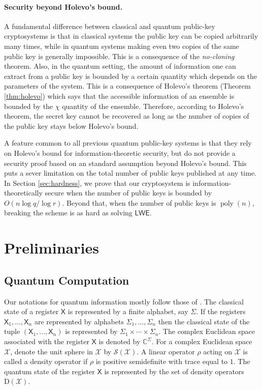 \documentclass[11pt]{article}
\theoremstyle{plain}
\theoremstyle{definition}
\DeclareMathOperator{\poly}{poly}
\def\C{\mathbb{C}}
\def\lwe{\mathsf{LWE}}
\def\X{\mathcal{X}}
\def\SX{\mathcal{S(X)}}
\begin{document}
\paragraph{Security beyond Holevo's bound.} 
A fundamental difference between classical and quantum public-key cryptosystems is that in classical systems the public key can be copied arbitrarily many times, while in quantum systems making even two copies of the same public key is generally impossible. This is a consequence of the \textit{no-cloning} theorem. Also, in the quantum setting, the amount of information one can extract from a public key is bounded by a certain quantity which depends on the parameters of the system. This is a consequence of Holevo's theorem (Theorem \ref{thm:holevo}) which says that the accessible information of an ensemble is bounded by the $\chi$ quantity of the ensemble. Therefore, according to Holevo's theorem, the secret key cannot be recovered as long as the number of copies of the public key stays below Holevo's bound.

A feature common to all previous quantum public-key systems is that they rely on Holevo's bound for information-theoretic security, but do not provide a security proof based on an standard assumption beyond Holevo's bound. This puts a sever limitation on the total number of public keys published at any time. In Section \ref{sec:hardness}, we prove that our cryptosystem is information-theoretically secure when the number of public keys is bounded by $O(n\log q / \log r)$. Beyond that, when the number of public keys is $\poly(n)$, breaking the scheme is as hard as solving $\lwe$.





\section{Preliminaries}
\label{sec:preli}



\subsection{Quantum Computation}

Our notations for quantum information mostly follow those of \cite{watrous2018theory}. The classical state of a register $\mathsf{X}$ is represented by a finite alphabet, say $\Sigma$. If the registers $\mathsf{X}_1, \dots, \mathsf{X}_n$ are represented by alphabets $\Sigma_1, \dots, \Sigma_n$ then the classical state of the tuple $(\mathsf{X}_1, \dots, \mathsf{X}_n)$ is represented by $\Sigma_1 \times \cdots \times \Sigma_n$. The complex Euclidean space associated with the register $\mathsf{X}$ is denoted by $\C^\Sigma$. For a complex Euclidean space $\X$, denote the unit sphere in $\X$ by $\SX$. A linear operator $\rho$ acting on $\X$ is called a density operator if $\rho$ is positive semidefinite with trace equal to $1$. The quantum state of the register $\mathsf{X}$ is represented by the set of density operators $\mathrm{D}(\X)$.
\end{document}
